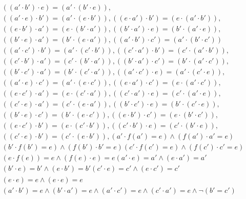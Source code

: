 \documentclass[12pt,letterpaper, onecolumn]{exam}
\begin{document}
\begin{questions}
	\begin{align*}
		((a' \cdot b') \cdot e) = (a' \cdot (b' \cdot e))  ,\\
		((a' \cdot e) \cdot b') = (a' \cdot (e \cdot b'))  ,
		((e \cdot a') \cdot b') = (e \cdot (a' \cdot b'))  ,\\
		((e \cdot b') \cdot a') = (e \cdot (b' \cdot a'))  ,
		((b' \cdot a') \cdot e) = (b' \cdot (a' \cdot e))  ,\\
		((b' \cdot e) \cdot a') = (b' \cdot (e \cdot a'))  ,
		((a' \cdot b') \cdot c') = (a' \cdot (b' \cdot c')) \\
		((a' \cdot c') \cdot b') = (a' \cdot (c' \cdot b'))  ,
		((c' \cdot a') \cdot b') = (c' \cdot (a' \cdot b'))  ,\\
		((c' \cdot b') \cdot a') = (c' \cdot (b' \cdot a'))  ,
		((b' \cdot a') \cdot c') = (b' \cdot (a' \cdot c'))  ,\\
		((b' \cdot c') \cdot a') = (b' \cdot (c' \cdot a'))  ,
		((a' \cdot c') \cdot e) = (a' \cdot (c' \cdot e))  ,\\
		((a' \cdot e) \cdot c') = (a' \cdot (e \cdot c'))  ,
		((e \cdot a') \cdot c') = (e \cdot (a' \cdot c'))  ,\\
		((e \cdot c') \cdot a') = (e \cdot (c' \cdot a'))  ,
		((c' \cdot a') \cdot e) = (c' \cdot (a' \cdot e))  ,\\
		((c' \cdot e) \cdot a') = (c' \cdot (e \cdot a'))  ,
		((b' \cdot c') \cdot e) = (b' \cdot (c' \cdot e))  ,\\
		((b' \cdot e) \cdot c') = (b' \cdot (e \cdot c'))  ,
		((e \cdot b') \cdot c') = (e \cdot (b' \cdot c'))  ,\\
		((e \cdot c') \cdot b') = (e \cdot (c' \cdot b'))  ,
		((c' \cdot b') \cdot e) = (c' \cdot (b' \cdot e))  ,\\
		((c' \cdot e) \cdot b') = (c' \cdot (e \cdot b'))  ,
		(a' \cdot f(a') = e) \land (f(a') \cdot a' = e) \\
		(b' \cdot f(b') = e) \land (f(b') \cdot b' = e) 
		(c' \cdot f(c') = e) \land (f(c') \cdot c' = e) \\
		(e \cdot f(e)) = e \land (f(e) \cdot e) = e 
		(a' \cdot e) = a' \land (e \cdot a') = a' \\
		(b' \cdot e) = b' \land (e \cdot b') = b' 
		(c' \cdot e) = c' \land (e \cdot c') = c' \\
		(e \cdot e) = e \land (e \cdot e) = e \\
		(a' \cdot b') = e \land (b' \cdot a') = e \land (a' \cdot c') = e \land (c' \cdot a') = e \land \neg(b' = c')
	\end{align*}



\end{questions}
\end{document}
